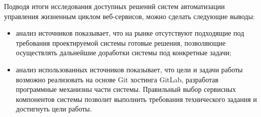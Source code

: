 Подводя итоги исследования доступных решений систем автоматизации управления жизненным циклом веб-сервисов, можно сделать следующие выводы:
\begin{itemize}
    \item анализ источников показывает, что на рынке отсутствуют подходящие под требования проектируемой системы готовые решения,
    позволяющие осуществлять дальнейшие доработки системы под конкретные задачи;
    \item анализ использованных источников показывает, что цели и задачи работы возможно реализовать на основе Git хостинга GitLab,
    разработав программные механизны части системы.
    Правильный выбор сервисных компонентов системы позволит выполнить требования технического задания и достигнуть цели работы.
\end{itemize}

\cite{vkrsen}
\cite{linuxPocket}
\cite{projectPhoenix}
\cite{devOpsPhy}
\cite{likeGoogle}
\cite{kuberForDevOps}
\cite{fasterDevOps}
\cite{cd}
\cite{ciCd}
\cite{web:docker:docs}
\cite{web:gitlab:docs}
\cite{web:docker:swarm}
\cite{web:npm:docs}
\cite{web:github:docs}
\cite{web:space:docs}
\cite{web:git:book}
\cite{web:bitbucket}
\cite{web:gitlab}
\cite{web:docker-kubernetes}


